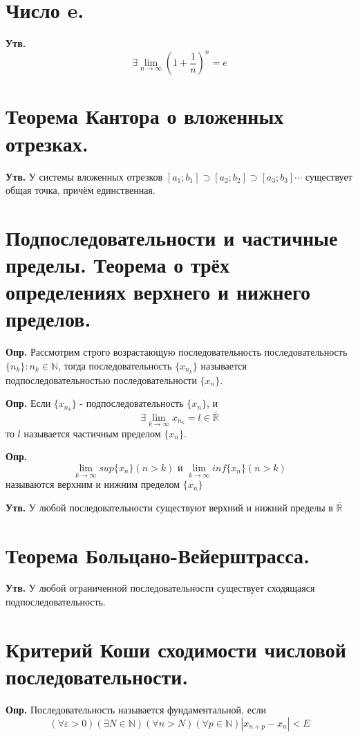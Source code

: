 \documentclass[a4paper,12pt]{article}
\begin{document}
\begin{flushleft}
	\section{Число e.}
	
	\textbf{Утв.} $$\exists \lim_{n \to \infty} (1 + \dfrac{1}{n})^n = e$$

	\section{Теорема Кантора о вложенных отрезках.}

	\textbf{Утв.} У системы вложенных отрезков $[a_1;b_1] \supset [a_2; b_2] \supset [a_3; b_3] \cdots$ существует общая точка, причём единственная. 
	
	\section{Подпоследовательности и частичные пределы. Теорема о трёх определениях верхнего и нижнего пределов.}

	\textbf{Опр.} Рассмотрим строго возрастающую последовательность последовательность $\{n_k\}: n_k \in \mathbb{N}$, тогда последовательность $\{x_{n_k}\}$ называется подпоследовательностью последовательности $\{x_n\}$.
	
	\textbf{Опр.} Если $\{x_{n_k}\}$ - подпоследовательность $\{x_n\}$, и $$\exists \lim_{k \to \infty} x_{n_k} = l \in \bar{\mathbb{R}}$$ то $l$ называется частичным пределом $\{x_n\}$.

	\textbf{Опр.} $$\lim_{k \to \infty} sup \{x_n\} (n >k) \text{ и } \lim_{k \to 
\infty} inf \{x_n\} (n > k)$$ называются верхним и нижним пределом $\{x_n\}$

	\textbf{Утв.} У любой последовательности существуют верхний и нижний пределы в $\bar{\mathbb{R}}$
	\section{Теорема Больцано-Вейерштрасса.}

	\textbf{Утв.} У любой ограниченной последовательности существует сходящаяся подпоследовательность.
	
	\section{Критерий Коши сходимости числовой последовательности.}

	\textbf{Опр.} Последовательность называется фундаментальной, если $$(\forall \varepsilon > 0) (\exists N \in \mathbb{N}) (\forall n > N) (\forall p \in \mathbb{N}) |x_{n + p} - x_n| < E$$


\end{flushleft}
\end{document}
